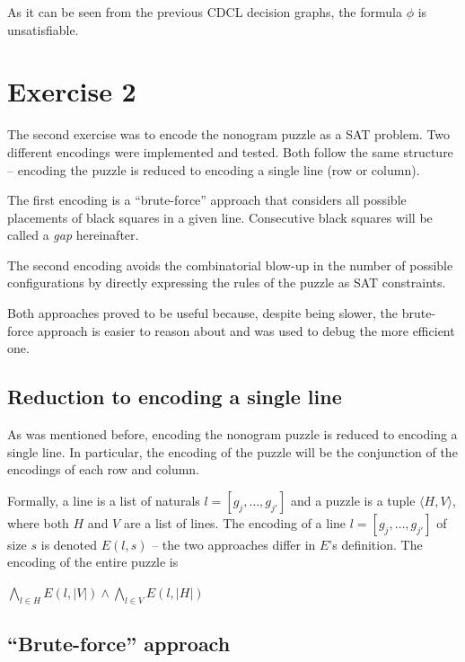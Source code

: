 \documentclass[12pt]{article}
\begin{document}
\vspace{1cm}

As it can be seen from the previous CDCL decision graphs, the formula $\phi$ is unsatisfiable.

\section*{Exercise 2}

The second exercise was to encode the nonogram puzzle as a SAT problem.
Two different encodings were implemented and tested.
Both follow the same structure -- encoding the puzzle is reduced to encoding a single line (row or column).

The first encoding is a ``brute-force'' approach that considers all possible placements of black squares in a given line.
Consecutive black squares will be called a \textit{gap} hereinafter.

The second encoding avoids the combinatorial blow-up in the number of possible configurations by directly expressing the rules of the puzzle as SAT constraints.

Both approaches proved to be useful because, despite being slower, the brute-force approach is easier to reason about and was used to debug the more efficient one.

\subsection*{Reduction to encoding a single line}

As was mentioned before, encoding the nonogram puzzle is reduced to encoding a single line.
In particular, the encoding of the puzzle will be the conjunction of the encodings of each row and column.

Formally, a line is a list of naturals $l = [g_j, \ldots, g_{j'}]$ and a puzzle is a tuple $\langle H, V\rangle$, where both $H$ and $V$ are a list of lines.
The encoding of a line $l = [g_j, \ldots, g_{j'}]$ of size $s$ is denoted $E(l, s)$ -- the two approaches differ in $E$'s definition.
The encoding of the entire puzzle is

\begin{center}
  $\bigwedge\limits_{l \in H} E(l, |V|) \wedge \bigwedge\limits_{l \in V} E(l, |H|)$
\end{center}


\subsection*{``Brute-force'' approach}
\end{document}
